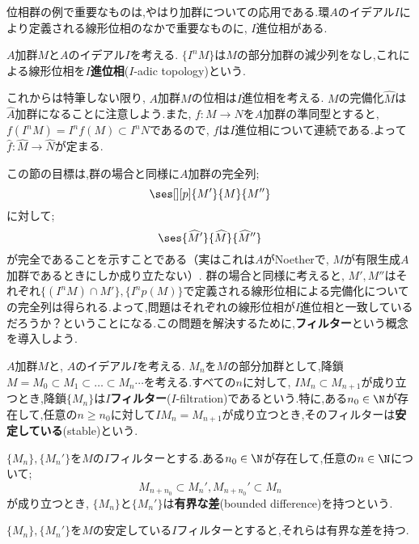 位相群の例で重要なものは,やはり加群についての応用である.環$A$のイデアル$I$により定義される線形位相のなかで重要なものに, $I$進位相がある.

\begin{defi}[$I$進位相]
	$A$加群$M$と$A$のイデアル$I$を考える. $\{I^nM\}$は$M$の部分加群の減少列をなし,これによる線形位相を$I$\textbf{進位相}($I$-adic topology)という.
\end{defi}

これからは特筆しない限り, $A$加群$M$の位相は$I$進位相を考える. $M$の完備化$\widehat{M}$は$\widehat{A}$加群になることに注意しよう.また, $f:M\to N$を$A$加群の準同型とすると, $f(I^nM)=I^nf(M)\subset I^nN$であるので, $f$は$I$進位相について連続である.よって$\widehat{f}:\widehat{M}\to\widehat{N}$が定まる.

この節の目標は,群の場合と同様に$A$加群の完全列;
\[\ses[][p]{M'}{M}{M''}\]
に対して;
\[\ses{\widehat{M}'}{\widehat{M}}{\widehat{M}''}\]
が完全であることを示すことである（実はこれは$A$がNoetherで, $M$が有限生成$A$加群であるときにしか成り立たない）. 群の場合と同様に考えると, $M',M''$はそれぞれ$\{(I^nM)\cap M'\},\{I^n p(M)\}$で定義される線形位相による完備化についての完全列は得られる.よって,問題はそれぞれの線形位相が$I$進位相と一致しているだろうか？ということになる.この問題を解決するために,\textbf{フィルター}という概念を導入しよう.

\begin{defi}[$I$フィルター]
	$A$加群$M$と, $A$のイデアル$I$を考える. $M_n$を$M$の部分加群として,降鎖$M=M_0\subset M_1\subset\dots\subset M_n\cdots$を考える.すべての$n$に対して, $IM_n\subset M_{n+1}$が成り立つとき,降鎖$\{M_n\}$は$I$\textbf{フィルター}($I$-filtration)であるという.特に,ある$n_0\in\N$が存在して,任意の$n\geq n_0$に対して$IM_n=M_{n+1}$が成り立つとき,そのフィルターは\textbf{安定している}(stable)という.
\end{defi}

\begin{defi}[有界な差]
	$\{M_n\},\{M_n'\}$を$M$の$I$フィルターとする.ある$n_0\in\N$が存在して,任意の$n\in\N$について;
	\[M_{n+n_0}\subset M_n', M_{n+n_0}'\subset M_n\]
	が成り立つとき, $\{M_n\}$と$\{M_n'\}$は\textbf{有界な差}(bounded difference)を持つという.
\end{defi}

\begin{lem}\label{lem:安定しているフィルターは有界な差を持つ}
	$\{M_n\},\{M_n'\}$を$M$の安定している$I$フィルターとすると,それらは有界な差を持つ.
\end{lem}

